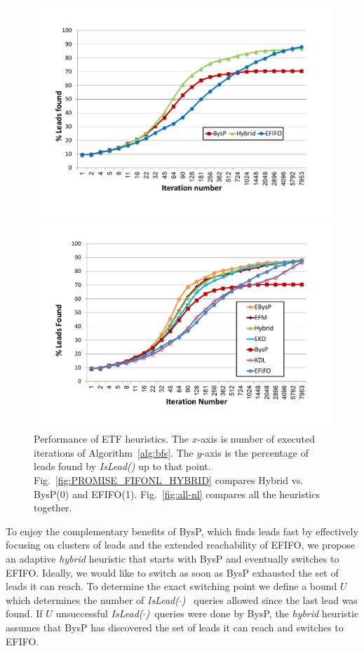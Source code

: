 \documentclass[journal]{IEEEtran}
\newcommand{\islead}[1]{{\em IsLead(#1)}}
\begin{document}
\begin{figure}[t]
\centering
\begin{subfloat}[\label{fig:PROMISE_FIFONL_HYBRID}]%
\centering
\includegraphics[width=0.85\columnwidth, trim={2.0cm 2.5cm 2.5cm 2.0cm},clip]{PROMISE_FIFONL_HYBRID.pdf}
\end{subfloat}
\qquad
\begin{subfloat}[\label{fig:all-nl}]
\centering
\includegraphics[width=0.85\columnwidth, trim={2.0cm 2.5cm 2.5cm 2.0cm},clip]{all_nl_with_promise.pdf}%
\end{subfloat}%
\caption{Performance of ETF heuristics. The $x$-axis is number of executed iterations of Algorithm~\ref{alg:bfs}. The $y$-axis is the percentage of leads found by \islead{} up to that point. Fig.~\ref{fig:PROMISE_FIFONL_HYBRID} compares Hybrid vs. BysP(0) and EFIFO(1). Fig.~\ref{fig:all-nl} compares all the heuristics together.}
\end{figure}

To enjoy the complementary benefits of BysP, which finds leads fast by effectively focusing on clusters of leads and the extended reachability of EFIFO, we propose an adaptive {\em hybrid} heuristic that starts with BysP and eventually switches to EFIFO. Ideally, we would like to switch as soon as BysP exhausted the set of leads it can reach. To determine the exact switching point we define a bound \(U\) which determines the number of \islead{$\cdot$}~ queries allowed since the last lead was found. If \(U\) unsuccessful \islead{$\cdot$}~queries were done by BysP, the \emph{hybrid} heuristic assumes that BysP has discovered the set of leads it can reach and switches to EFIFO.
\end{document}
